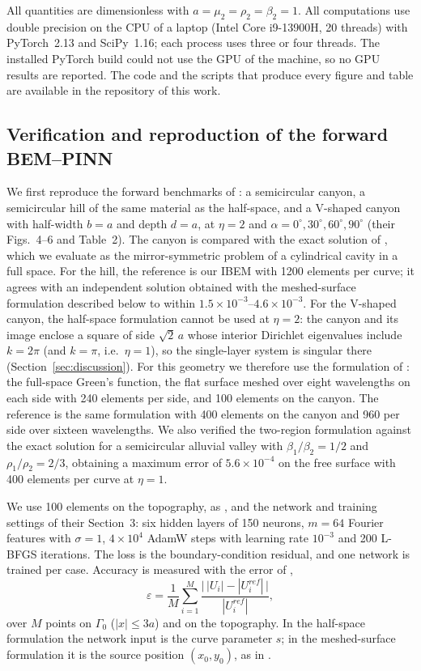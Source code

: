 \documentclass[11pt,twoside]{article}
\begin{document}
All quantities are dimensionless with $a=\mu_2=\rho_2=\beta_2=1$. All computations use double precision on the CPU of a laptop (Intel Core i9-13900H, 20 threads) with PyTorch~2.13 and SciPy~1.16; each process uses three or four threads. The installed PyTorch build could not use the GPU of the machine, so no GPU results are reported. The code and the scripts that produce every figure and table are available in the repository of this work.

\subsection{Verification and reproduction of the forward BEM--PINN}\label{sec:forward}

We first reproduce the forward benchmarks of \citet{wu_novel_2026}: a semicircular canyon, a semicircular hill of the same material as the half-space, and a V-shaped canyon with half-width $b=a$ and depth $d=a$, at $\eta=2$ and $\alpha=0^\circ,30^\circ,60^\circ,90^\circ$ (their Figs.~4--6 and Table~2). The canyon is compared with the exact solution of \citet{Trifunac1973}, which we evaluate as the mirror-symmetric problem of a cylindrical cavity in a full space. For the hill, the reference is our IBEM with 1200 elements per curve; it agrees with an independent solution obtained with the meshed-surface formulation described below to within $1.5\times10^{-3}$--$4.6\times10^{-3}$. For the V-shaped canyon, the half-space formulation cannot be used at $\eta=2$: the canyon and its image enclose a square of side $\sqrt2\,a$ whose interior Dirichlet eigenvalues include $k=2\pi$ (and $k=\pi$, i.e.\ $\eta=1$), so the single-layer system is singular there (Section~\ref{sec:discussion}). For this geometry we therefore use the formulation of \citet{wu_novel_2026}: the full-space Green's function, the flat surface meshed over eight wavelengths on each side with 240 elements per side, and 100 elements on the canyon. The reference is the same formulation with 400 elements on the canyon and 960 per side over sixteen wavelengths. We also verified the two-region formulation against the exact solution for a semicircular alluvial valley \citep{Trifunac1971} with $\beta_1/\beta_2=1/2$ and $\rho_1/\rho_2=2/3$, obtaining a maximum error of $5.6\times10^{-4}$ on the free surface with 400 elements per curve at $\eta=1$.

We use 100 elements on the topography, as \citet{wu_novel_2026}, and the network and training settings of their Section~3: six hidden layers of 150 neurons, $m=64$ Fourier features with $\sigma=1$, $4\times10^4$ AdamW steps with learning rate $10^{-3}$ and 200 L-BFGS iterations. The loss is the boundary-condition residual, and one network is trained per case. Accuracy is measured with the error of \citet{wu_novel_2026},
\begin{equation*}
  \varepsilon = \frac{1}{M}\sum_{i=1}^{M}\frac{\bigl|\,|U_i| - |U_i^{ref}|\,\bigr|}{|U_i^{ref}|},
\end{equation*}
over $M$ points on $\Gamma_0$ ($|x|\le 3a$) and on the topography. In the half-space formulation the network input is the curve parameter $s$; in the meshed-surface formulation it is the source position $(x_0,y_0)$, as in \citet{wu_novel_2026}.
\end{document}
